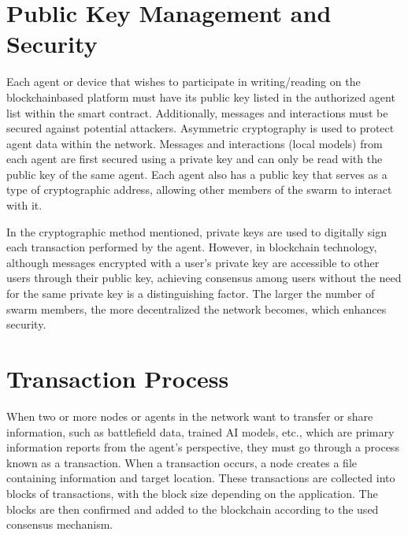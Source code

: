 \documentclass[letterpaper,10pt,english]{sphinxmanual}
\let\sphinxpxdimen\pdfpxdimen\else\newdimen\sphinxpxdimen
\begin{document}
\section{Public Key Management and Security}
\label{\detokenize{introduction:public-key-management-and-security}}
\sphinxAtStartPar
Each agent or device that wishes to participate in writing/reading on the blockchain\sphinxhyphen{}based platform must have its public key listed in the authorized agent list within the smart contract. Additionally, messages and interactions must be secured against potential attackers. Asymmetric cryptography is used to protect agent data within the network. Messages and interactions (local models) from each agent are first secured using a private key and can only be read with the public key of the same agent. Each agent also has a public key that serves as a type of cryptographic address, allowing other members of the swarm to interact with it.

\noindent{\hspace*{\fill}\sphinxincludegraphics[width=600\sphinxpxdimen]{{_static/communication-concept}.png}\hspace*{\fill}}

\sphinxAtStartPar
In the cryptographic method mentioned, private keys are used to digitally sign each transaction performed by the agent. However, in blockchain technology, although messages encrypted with a user’s private key are accessible to other users through their public key, achieving consensus among users without the need for the same private key is a distinguishing factor. The larger the number of swarm members, the more decentralized the network becomes, which enhances security.


\section{Transaction Process}
\label{\detokenize{introduction:transaction-process}}
\sphinxAtStartPar
When two or more nodes or agents in the network want to transfer or share information, such as battlefield data, trained AI models, etc., which are primary information reports from the agent’s perspective, they must go through a process known as a transaction. When a transaction occurs, a node creates a file containing information and target location. These transactions are collected into blocks of transactions, with the block size depending on the application. The blocks are then confirmed and added to the blockchain according to the used consensus mechanism.
\end{document}
